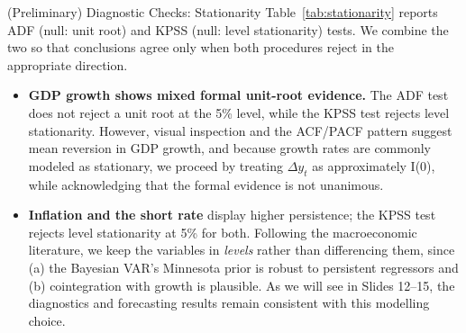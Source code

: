 \documentclass[9pt]{beamer}
\begin{document}
\begin{frame}{(Preliminary) Diagnostic Checks: Stationarity}
\footnotesize
Table~\ref{tab:stationarity} reports ADF (null: unit root) and KPSS (null: level stationarity) tests. We combine the two so that conclusions agree only when both procedures reject in the appropriate direction.

{\footnotesize
\setlength{\tabcolsep}{5pt}

}

\footnotesize
\begin{itemize}
  \item \textbf{GDP growth shows mixed formal unit-root evidence.} The ADF test does not reject a unit root at the 5\% level, while the KPSS test rejects level stationarity. However, visual inspection and the ACF/PACF pattern suggest mean reversion in GDP growth, and because growth rates are commonly modeled as stationary, we proceed by treating $\Delta y_t$ as approximately I(0), while acknowledging that the formal evidence is not unanimous.

  \item \textbf{Inflation and the short rate} display higher persistence; the KPSS test rejects level stationarity at 5\% for both. Following the macroeconomic literature, we keep the variables in \textit{levels} rather than differencing them, since (a) the Bayesian VAR's Minnesota prior is robust to persistent regressors and (b) cointegration with growth is plausible. As we will see in Slides 12–15, the diagnostics and forecasting results remain consistent with this modelling choice.
\end{itemize}

\end{frame}
\end{document}
